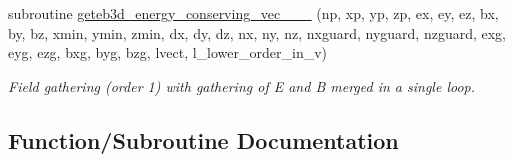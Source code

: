 \begin{DoxyCompactItemize}
subroutine \hyperlink{field__gathering__3d__o1_8_f90_a3788d4a011335c931d314bc69f969508}{geteb3d\+\_\+energy\+\_\+conserving\+\_\+vec\+\_\+\_\+\_} (np, xp, yp, zp, ex, ey, ez, bx, by, bz,                                                                                                                                                                       xmin, ymin, zmin,                                                                                                                                                                                               dx, dy, dz, nx, ny, nz, nxguard, nyguard, nzguard,                                                                                                                                                                       exg, eyg, ezg, bxg, byg, bzg, lvect, l\+\_\+lower\+\_\+order\+\_\+in\+\_\+v)
\begin{DoxyCompactList}\small\item\em Field gathering (order 1) with gathering of E and B merged in a single loop. \end{DoxyCompactList}\end{DoxyCompactItemize}


\subsection{Function/\+Subroutine Documentation}
